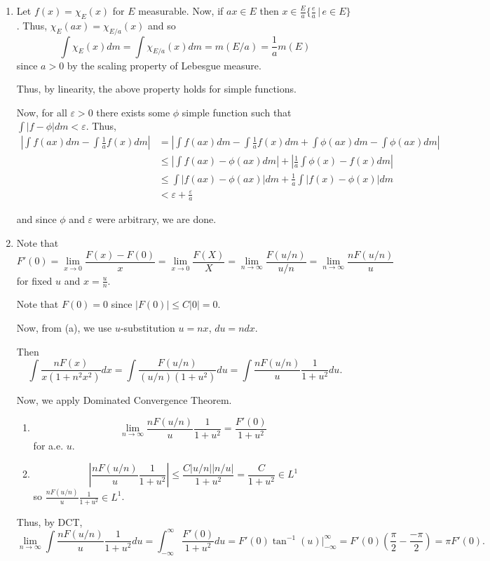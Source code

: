 \documentclass[12pt]{Homework}
\begin{document}
\begin{solution}$\,$
\begin{enumerate}[label=(\alph*)]
    \item Let $f(x)=\chi_E(x)$ for $E$ measurable. Now, if $ax\in E$ then $x\in\frac{E}{a}\{\frac{e}{a}\,|\,e\in E\}$. Thus, $\chi_E(ax)=\chi_{E/a}(x)$ and so $$\int\chi_E(x)dm=\int\chi_{E/a}(x)dm=m(E/a)=\frac{1}{a}m(E)$$ since $a>0$ by the scaling property of Lebesgue measure.

    Thus, by linearity, the above property holds for simple functions.

    Now, for all $\varepsilon>0$ there exists some $\phi$ simple function such that $\int|f-\phi|dm<\varepsilon$. Thus,
    \begin{align*}
        \left|\int f(ax)dm-\int\frac{1}{a}f(x)dm\right|&=\left|\int f(ax)dm-\int\frac{1}{a}f(x)dm+\int\phi(ax)dm-\int\phi(ax)dm\right|\\
        &\le\left|\int f(ax)-\phi(ax)dm\right|+\left|\frac{1}{a}\int\phi(x)-f(x)dm \right|\\
        &\le\int|f(ax)-\phi(ax)|dm+\frac{1}{a}\int|f(x)-\phi(x)|dm\\
        &<\varepsilon+\frac{\varepsilon}{a}
    \end{align*}

    and since $\phi$ and $\varepsilon$ were arbitrary, we are done.
    \item Note that $$F'(0)=\lim_{x\to0}\frac{F(x)-F(0)}{x}=\lim_{x\to0}\frac{F(X)}{X}=\lim_{n\to\infty}\frac{F(u/n)}{u/n}=\lim_{n\to\infty}\frac{nF(u/n)}{u}$$ for fixed $u$ and $x=\frac{u}{n}$.

    Note that $F(0)=0$ since $|F(0)|\le C|0|=0.$

    Now, from (a), we use $u$-substitution $u=nx$, $du=ndx$.

    Then $$\int\frac{nF(x)}{x(1+n^2x^2)}dx=\int\frac{F(u/n)}{(u/n)(1+u^2)}du=\int\frac{nF(u/n)}{u}\frac{1}{1+u^2}du.$$

    Now, we apply Dominated Convergence Theorem.
    \begin{enumerate}[label=(\roman*)]
        \item $$\lim_{n\to\infty}\frac{nF(u/n)}{u}\frac{1}{1+u^2}=\frac{F'(0)}{1+u^2}$$ for a.e. $u$.
        \item $$\left|\frac{nF(u/n)}{u}\frac{1}{1+u^2}\right|\le\frac{C|u/n||n/u|}{1+u^2}=\frac{C}{1+u^2}\in L^1$$ so $\frac{nF(u/n)}{u}\frac{1}{1+u^2}\in L^1$.
    \end{enumerate}
Thus, by DCT, $$\lim_{n\to\infty}\int\frac{nF(u/n)}{u}\frac{1}{1+u^2}du=\int_{-\infty}^\infty\frac{F'(0)}{1+u^2}du=F'(0)\tan^{-1}(u)\bigg|_{-\infty}^\infty=F'(0)(\frac{\pi}{2}-\frac{-\pi}{2})=\pi F'(0).$$
\end{enumerate}
\end{solution}
\newpage
\end{document}
